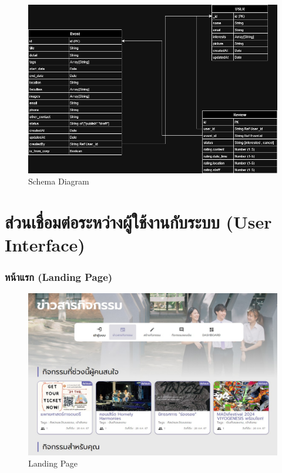 \begin{figure}[H]
\begin{center}
\includegraphics[scale=0.4]{public/db-diagram.png}
\end{center}
\caption[Poem]{Schema Diagram}
\label{fig:db-schema}
\end{figure}
\section{ส่วนเชื่อมต่อระหว่างผู้ใช้งานกับระบบ (User Interface)}
\subsubsection{หน้าแรก (Landing Page)}

\begin{figure}[H]
\begin{center}
\includegraphics[scale=0.5]{public/landing.jpg}
\end{center}
\caption[Poem]{Landing Page}
\label{fig:landing-page}
\end{figure}
\clearpage
